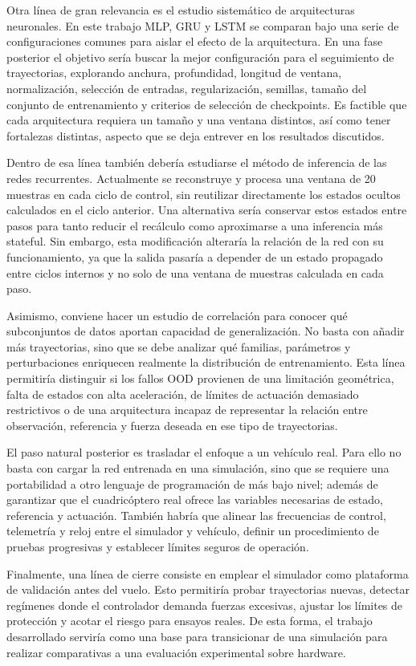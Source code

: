 Otra línea de gran relevancia es el estudio sistemático de arquitecturas neuronales. En
este trabajo MLP, GRU y LSTM se comparan bajo una serie de configuraciones comunes para
aislar el efecto de la arquitectura. En una fase posterior el objetivo sería buscar la
mejor configuración para el seguimiento de trayectorias, explorando anchura, profundidad,
longitud de ventana, normalización, selección de entradas, regularización, semillas, 
tamaño del conjunto de entrenamiento y criterios de selección de checkpoints. Es factible
que cada arquitectura requiera un tamaño y una ventana distintos, así como tener fortalezas
distintas, aspecto que se deja entrever en los resultados discutidos.

Dentro de esa línea también debería estudiarse el método de inferencia de las redes recurrentes.
Actualmente se reconstruye y procesa una ventana de 20 muestras en cada ciclo de control,
sin reutilizar directamente los estados ocultos calculados en el ciclo anterior. Una alternativa
sería conservar estos estados entre pasos para tanto reducir el recálculo como aproximarse
a una inferencia más stateful. Sin embargo, esta modificación alteraría la relación de la
red con su funcionamiento, ya que la salida pasaría a depender de un estado propagado entre
ciclos internos y no solo de una ventana de muestras calculada en cada paso.

Asimismo, conviene hacer un estudio de correlación para conocer qué subconjuntos de datos
aportan capacidad de generalización. No basta con añadir más trayectorias, sino que se
debe analizar qué familias, parámetros y perturbaciones enriquecen realmente la distribución
de entrenamiento. Esta línea permitiría distinguir si los fallos OOD provienen de una
limitación geométrica, falta de estados con alta aceleración, de límites de actuación demasiado
restrictivos o de una arquitectura incapaz de representar la relación entre observación, referencia
y fuerza deseada en ese tipo de trayectorias.

El paso natural posterior es trasladar el enfoque a un vehículo real. Para ello no basta con cargar
la red entrenada en una simulación, sino que se requiere una portabilidad a otro lenguaje de
programación de más bajo nivel; además de garantizar que el cuadricóptero real ofrece las variables
necesarias de estado, referencia y actuación. También habría que alinear las frecuencias de control,
telemetría y reloj entre el simulador y vehículo, definir un procedimiento de pruebas progresivas y
establecer límites seguros de operación.

Finalmente, una línea de cierre consiste en emplear el simulador como plataforma de
validación antes del vuelo. Esto permitiría probar trayectorias nuevas, detectar regímenes
donde el controlador demanda fuerzas excesivas, ajustar los límites de protección y
acotar el riesgo para ensayos reales. De esta forma, el trabajo desarrollado serviría como
una base para transicionar de una simulación para realizar comparativas a una evaluación
experimental sobre hardware.